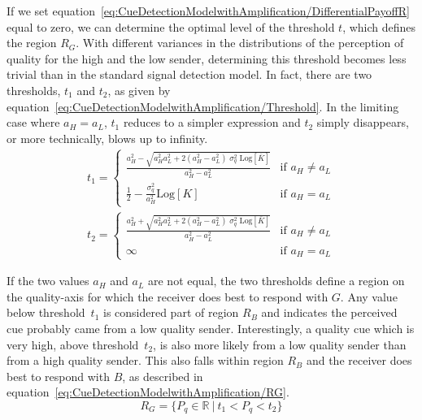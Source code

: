 \documentclass[a4paper,12pt]{article}
\numberwithin{equation}{section}
\numberwithin{figure}{section}
\begin{document}
If we set equation~\ref{eq:CueDetectionModelwithAmplification/DifferentialPayoffR} equal to zero, we can determine the optimal level of the threshold $t$, which defines the region $R_{G}$. With different variances in the distributions of the perception of quality for the high and the low sender, determining this threshold becomes less trivial than in the standard signal detection model. In fact, there are two thresholds, $t_{1}$ and $t_{2}$, as given by equation~\ref{eq:CueDetectionModelwithAmplification/Threshold}. In the limiting case where $a_{H}=a_{L}$, $t_{1}$ reduces to a simpler expression and $t_{2}$ simply disappears, or more technically, blows up to infinity.
\begin{subequations}
\label{eq:CueDetectionModelwithAmplification/Threshold}
\begin{gather}
t_{1} = \begin{cases}
\displaystyle \frac{a_{H}^{2} - \sqrt{a_{H}^{2} a_{L}^{2} + 2(a_{H}^{2} - a_{L}^{2}) \; \sigma_{q}^{2} \; \text{Log}[\bar{K}]}}{a_{H}^{2}-a_{L}^{2}} & \text{if } a_{H} \neq a_{L}\\
\displaystyle \frac{1}{2}-\frac{\sigma_{q}^{2}}{a_{H}^{2}} \text{Log}[K] & \text{if } a_{H} = a_{L}
\end{cases}\\
t_{2}= \begin{cases}
\displaystyle \frac{a_{H}^{2} + \sqrt{a_{H}^{2} a_{L}^{2} + 2(a_{H}^{2} - a_{L}^{2}) \; \sigma_{q}^{2} \; \text{Log}[\bar{K}]}}{a_{H}^{2}-a_{L}^{2}} & \text{if } a_{H} \neq a_{L}\\
\infty & \text{if } a_{H} = a_{L}
\end{cases}
\end{gather}
\end{subequations}

If the two values $a_{H}$ and $a_{L}$ are not equal, the two thresholds define a region on the quality-axis for which the receiver does best to respond with $G$. Any value below threshold~$t_{1}$ is considered part of region $R_{B}$ and indicates the perceived cue probably came from a low quality sender. Interestingly, a quality cue which is very high, above threshold~$t_{2}$, is also more likely from a low quality sender than from a high quality sender. This also falls within region $R_{B}$ and the receiver does best to respond with $B$, as described in equation~\ref{eq:CueDetectionModelwithAmplification/RG}.
\begin{equation}
\label{eq:CueDetectionModelwithAmplification/RG}
R_{G} = \{P_{q} \in \mathbb{R} \ | \ t_{1}<P_{q}<t_{2}\}
\end{equation}
\end{document}
